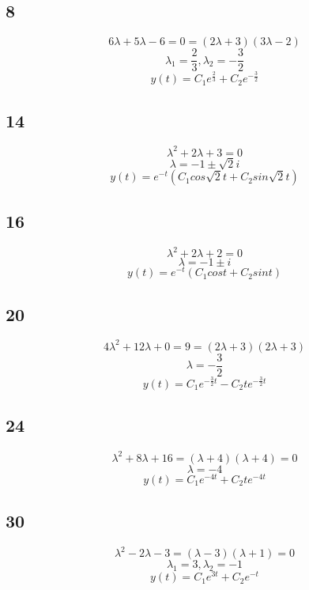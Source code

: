 \documentclass[12pt, a4paper]{IEEEtran}
\begin{document}
    \subsection*{8}
    $$6\lambda+5\lambda-6=0=(2\lambda+3)(3\lambda-2)$$
    $$\lambda_1=\frac{2}{3}, \lambda_2=-\frac{3}{2}$$
    $$y(t)=C_1e^{\frac{2}{3}}+C_2e^{-\frac{3}{2}}$$

    \subsection*{14}
    $$\lambda^2+2\lambda+3=0$$
    $$\lambda=-1\pm \sqrt{2}i$$
    $$y(t)=e^{-t}(C_1cos\sqrt{2}t+C_2sin\sqrt{2}t)$$

    \subsection*{16}
    $$\lambda^2+2\lambda+2=0$$
    $$\lambda=-1\pm i$$
    $$y(t)=e^{-t}(C_1cost+C_2sint)$$

    \subsection*{20}
    $$4\lambda^2+12\lambda+0=9=(2\lambda+3)(2\lambda+3)$$
    $$\lambda=-\frac{3}{2}$$
    $$y(t)=C_1e^{-\frac{3}{2}t}-C_2te^{-\frac{3}{2}t}$$

    \subsection*{24}
    $$\lambda^2+8\lambda+16=(\lambda+4)(\lambda+4)=0$$
    $$\lambda=-4$$
    $$y(t)=C_1e^{-4t}+C_2te^{-4t}$$

    \subsection*{30}
    $$\lambda^2-2\lambda-3=(\lambda-3)(\lambda+1)=0$$
    $$\lambda_1=3, \lambda_2=-1$$
    $$y(t)=C_1e^{3t}+C_2e^{-t}$$
\end{document}
